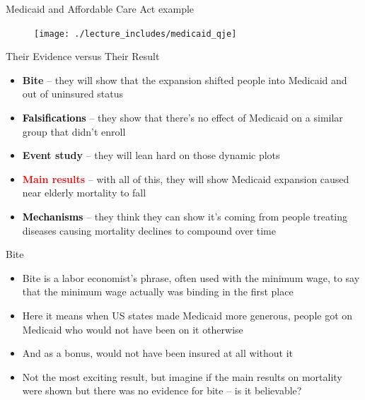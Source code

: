 \documentclass{beamer}
\begin{document}
\begin{frame}{Medicaid and Affordable Care Act example}

\begin{figure}
\texttt{[image: ./lecture\_includes/medicaid\_qje]}
\end{figure}

\end{frame}
\begin{frame}{Their Evidence versus Their Result}

\begin{itemize}
\item \textbf{Bite} -- they will show that the expansion shifted people into Medicaid and out of uninsured status
\item \textcolor{black}{\textbf{Falsifications}} -- they show that there's no effect of Medicaid on a similar group that didn't enroll
\item \textbf{Event study} -- they will lean hard on those dynamic plots
\item \textcolor{red}{\textbf{Main results}} -- with all of this, they will show Medicaid expansion caused near elderly mortality to fall
\item \textcolor{black}{\textbf{Mechanisms}} -- they think they can show it's coming from people treating diseases causing mortality declines to compound over time
\end{itemize}

\end{frame}

\begin{frame}{Bite}

\begin{itemize}
\item Bite is a labor economist's phrase, often used with the minimum wage, to say that the minimum wage actually was binding in the first place
\item Here it means when US states made Medicaid more generous, people got on Medicaid who would not have been on it otherwise
\item And as a bonus, would not have been insured at all without it
\item Not the most exciting result, but imagine if the main results on mortality were shown but there was no evidence for bite -- is it believable?
\end{itemize}

\end{frame}


\end{document}
